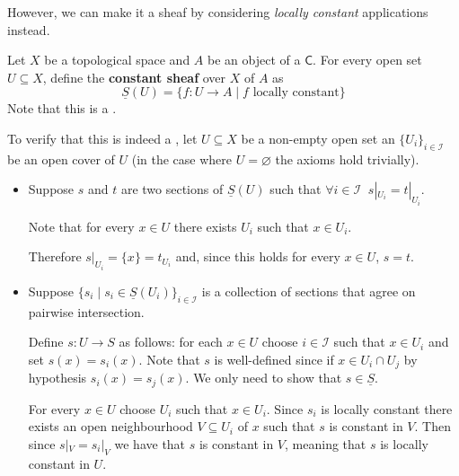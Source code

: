 \documentclass[../main.tex]{subfiles}
\begin{document}
However, we can make it a sheaf by considering \textit{locally constant} applications instead.
\begin{example} \label{ex:constant-sheaf}
  Let \(X\) be a topological space and \(A\) be an object of a  \(\mathsf{C}\).
  For every open set \(U \subseteq X\), define the \textbf{constant sheaf} over \(X\) of \(A\) as
  \begin{equation*}
    \underline{S}(U) = \{f: U \to A \mid f \text{ locally constant}\}
  \end{equation*}
  Note that this is a .

  To verify that this is indeed a , let \(U \subseteq X\) be a non-empty open set an \(\{U_{i}\}_{i \in \mathcal{I}}\) be an open cover of \(U\) (in the case where \(U = \varnothing\) the axioms hold trivially).
  \begin{itemize}
    \item[\ref{axiom:sheaf-identity}] Suppose \(s\) and \(t\) are two sections of \(\underline{S}(U)\) such that \(\forall i \in \mathcal{I} \;\; s|_{U_{i}} = t|_{U_{i}}\).

          Note that for every \(x \in U\) there exists \(U_{i}\) such that \(x \in U_{i}\).

          Therefore \(s|_{U_{i}} = \{x\} = t_{U_{i}}\) and, since this holds for every \(x \in U\), \(s = t\).

    \item[\ref{axiom:sheaf-gluability}] Suppose \(\{s_{i} \mid s_{i} \in \underline{S}(U_{i})\}_{i \in \mathcal{I}}\) is a collection of sections that agree on pairwise intersection.

          Define \(s: U \to S\) as follows: for each \(x \in U\) choose \(i \in \mathcal{I}\) such that \(x \in U_{i}\) and set \(s(x) = s_{i}(x)\).
          Note that \(s\) is well-defined since if \(x \in U_{i} \cap U_{j}\) by hypothesis \(s_{i}(x) = s_{j}(x)\).
          We only need to show that \(s \in \underline{S}\).

          For every \(x \in U\) choose \(U_{i}\) such that \(x \in U_{i}\). Since \(s_{i}\) is locally constant there exists an open neighbourhood \(V \subseteq U_{i}\) of \(x\) such that \(s\) is constant in \(V\). Then since \(s|_{V} = s_{i}|_{V}\) we have that \(s\) is constant in \(V\), meaning that \(s\) is locally constant in \(U\).
  \end{itemize}
\end{example}
\end{document}
